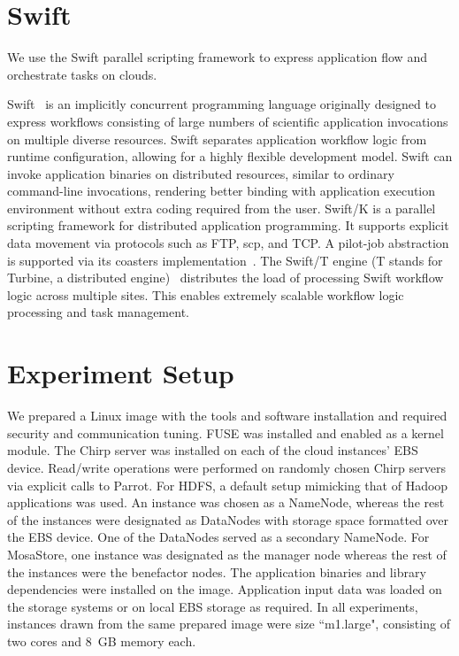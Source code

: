 \documentclass{sig-alternate}
\begin{document}
\section{Swift}\label{sec:swift}
We use the Swift parallel scripting framework to express application flow and
orchestrate tasks on clouds. 

Swift~\cite{Swift_2011} is an implicitly concurrent programming language
originally designed to express workflows consisting of large numbers of
scientific application invocations on multiple diverse resources. Swift
separates application workflow logic from runtime configuration, allowing for a
highly flexible development model. Swift can invoke application binaries on
distributed resources, similar to ordinary command-line invocations, rendering
better binding with application execution environment without extra coding
required from the user. Swift/K is a parallel scripting framework for
distributed application programming. It supports explicit data movement via
protocols such as FTP, scp, and TCP. A pilot-job abstraction is supported via
its coasters implementation~\cite{Coasters_UCC_2011}. The Swift/T engine (T
stands for Turbine, a distributed engine)~\cite{fi:2013} distributes the load
of processing Swift workflow logic across multiple sites. This enables
extremely scalable workflow logic processing and task management. 

\section{Experiment Setup}\label{sec:expsetup}
We prepared a Linux image with the tools and software installation and required
security and communication tuning. FUSE was installed and enabled as a kernel
module.  The Chirp server was installed on each of the cloud instances' EBS
device.  Read/write operations were performed on randomly chosen Chirp servers
via explicit calls to Parrot. For HDFS, a default setup mimicking that of
Hadoop applications was used. An instance was chosen as a NameNode, whereas the
rest of the instances were designated as DataNodes with storage space formatted
over the EBS device. One of the DataNodes served as a secondary NameNode. For
MosaStore, one instance was designated as the manager node whereas the rest of
the instances were the benefactor nodes. The application binaries and library
dependencies were installed on the image.  Application input data was loaded on
the storage systems or on local EBS storage as required. In all experiments,
instances drawn from the same prepared image were size ``m1.large", consisting
of two cores and 8~GB memory each.
\end{document}
